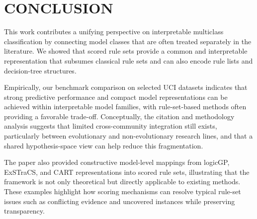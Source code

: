 \documentclass[a4paper,twoside]{article}
\begin{document}
\section{\uppercase{Conclusion}}

This work contributes a unifying perspective on interpretable multiclass classification by connecting model classes that are often treated separately in the literature. We showed that scored rule sets provide a common and interpretable representation that subsumes classical rule sets and can also encode rule lists and decision-tree structures.

Empirically, our benchmark comparison on selected UCI datasets indicates that strong predictive performance and compact model representations can be achieved within interpretable model families, with rule-set-based methods often providing a favorable trade-off. Conceptually, the citation and methodology analysis suggests that limited cross-community integration still exists, particularly between evolutionary and non-evolutionary research lines, and that a shared hypothesis-space view can help reduce this fragmentation.

The paper also provided constructive model-level mappings from logicGP, ExSTraCS, and CART representations into scored rule sets, illustrating that the framework is not only theoretical but directly applicable to existing methods. These examples highlight how scoring mechanisms can resolve typical rule-set issues such as conflicting evidence and uncovered instances while preserving transparency.



 
\end{document}

